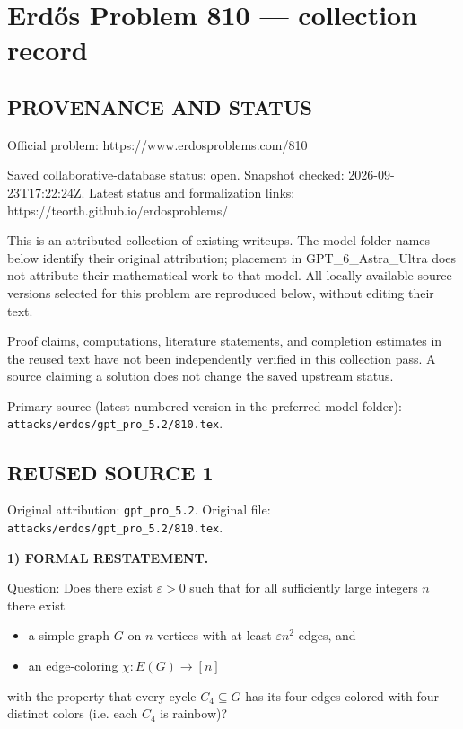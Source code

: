 \section*{Erd\H{o}s Problem 810 --- collection record}

\subsection*{PROVENANCE AND STATUS}
Official problem: https://www.erdosproblems.com/810

Saved collaborative-database status: open.
Snapshot checked: 2026-09-23T17:22:24Z.
Latest status and formalization links: https://teorth.github.io/erdosproblems/

This is an attributed collection of existing writeups. The model-folder names below identify their original attribution; placement in GPT\_6\_Astra\_Ultra does not attribute their mathematical work to that model. All locally available source versions selected for this problem are reproduced below, without editing their text.

Proof claims, computations, literature statements, and completion estimates in the reused text have not been independently verified in this collection pass. A source claiming a solution does not change the saved upstream status.

Primary source (latest numbered version in the preferred model folder): \texttt{attacks/erdos/gpt\_pro\_5.2/810.tex}.

\subsection*{REUSED SOURCE 1}
Original attribution: \texttt{gpt\_pro\_5.2}.
Original file: \texttt{attacks/erdos/gpt\_pro\_5.2/810.tex}.


\noindent\textbf{1) FORMAL RESTATEMENT.}

Question: Does there exist $\varepsilon>0$ such that for all sufficiently large integers $n$ there exist
\begin{itemize}
\item a simple graph $G$ on $n$ vertices with at least $\varepsilon n^2$ edges, and
\item an edge-coloring $\chi:E(G)\to [n]$
\end{itemize}
with the property that every cycle $C_4\subseteq G$ has its four edges colored with four distinct colors (i.e. each $C_4$ is rainbow)?

